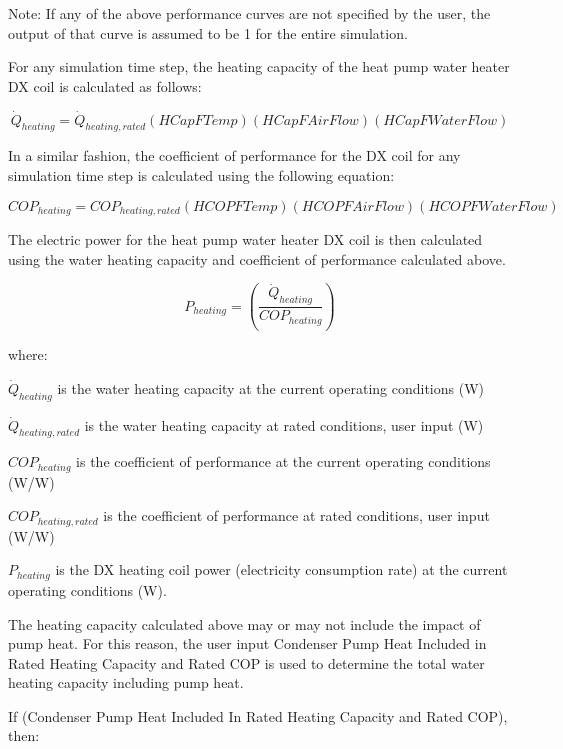 Note: If any of the above performance curves are not specified by the user, the output of that curve is assumed to be 1 for the entire simulation.

For any simulation time step, the heating capacity of the heat pump water heater DX coil is calculated as follows:

\begin{equation}
{\dot{Q}_{heating}} = {\dot{Q}_{heating,rated}}\left( {HCapFTemp} \right)\left( {HCapFAirFlow} \right)\left( {HCapFWaterFlow} \right)
\end{equation}

In a similar fashion, the coefficient of performance for the DX coil for any simulation time step is calculated using the following equation:

\begin{equation}
CO{P_{heating}} = CO{P_{heating,rated}}\left( {HCOPFTemp} \right)\left( {HCOPFAirFlow} \right)\left( {HCOPFWaterFlow} \right)
\end{equation}

The electric power for the heat pump water heater DX coil is then calculated using the water heating capacity and coefficient of performance calculated above.

\begin{equation}
{P_{heating}} = \left( {\frac{{{{\dot{Q}}_{heating}}}}{{CO{P_{heating}}}}} \right)
\end{equation}

where:

\({\dot{Q}_{heating}}\) is the water heating capacity at the current operating conditions (W)

\({\dot{Q}_{heating,rated}}\) is the water heating capacity at rated conditions, user input (W)

\(CO{P_{heating}}\) is the coefficient of performance at the current operating conditions (W/W)

\(CO{P_{heating,rated}}\) is the coefficient of performance at rated conditions, user input (W/W)

\({P_{heating}}\) is the DX heating coil power (electricity consumption rate) at the current operating conditions (W).

The heating capacity calculated above may or may not include the impact of pump heat. For this reason, the user input Condenser Pump Heat Included in Rated Heating Capacity and Rated COP is used to determine the total water heating capacity including pump heat.

If (Condenser Pump Heat Included In Rated Heating Capacity and Rated COP), then:

